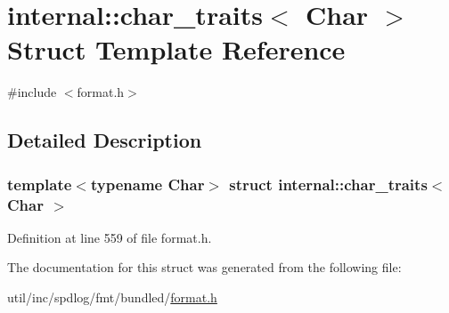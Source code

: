 \hypertarget{structinternal_1_1char__traits}{}\section{internal\+:\+:char\+\_\+traits$<$ Char $>$ Struct Template Reference}
\label{structinternal_1_1char__traits}


{\ttfamily \#include $<$format.\+h$>$}



\subsection{Detailed Description}
\subsubsection*{template$<$typename Char$>$\newline
struct internal\+::char\+\_\+traits$<$ Char $>$}



Definition at line 559 of file format.\+h.



The documentation for this struct was generated from the following file\+:\begin{DoxyCompactItemize}
\item 
util/inc/spdlog/fmt/bundled/\hyperlink{format_8h}{format.\+h}\end{DoxyCompactItemize}

